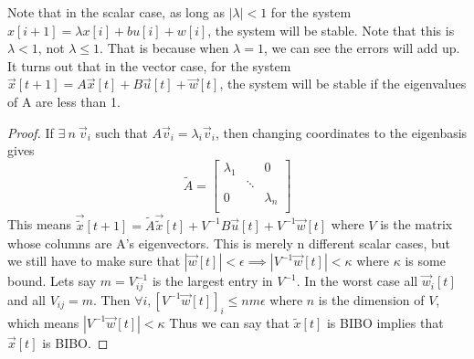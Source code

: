 \documentclass{article}
\newtheorem{proof}{Proof}
\begin{document}
Note that in the scalar case, as long as $|\lambda| < 1$ for the system $x[i+1]=\lambda x[i]+bu[i]+w[i]$, the system will be stable. Note that this is $\lambda<1$, not $\lambda \leq 1$. That is because when $\lambda=1$, we can see the errors will add up.
It turns out that in the vector case, for the system $\vec{x}[t+1]=A \vec{x}[t]+B\vec{u}[t]+\vec{w}[t]$, the system will be stable if the eigenvalues of A are less than 1.
\begin{proof}
    If $\exists \> n \> \vec{v}_i$ such that $A\vec{v}_i=\lambda_i\vec{v}_i$, then changing coordinates to the eigenbasis gives
    $$\tilde{A}=
        \left[
        \begin{array}{ccc}
        \lambda_1 &  & 0 \\
         & \ddots &  \\
        0 &  & \lambda_n \\
        \end{array}
        \right] $$
    This means $\vec{\tilde{x}}[t+1]=\tilde{A}\vec{\tilde{x}}[t]+V^{-1}B\vec{u}[t]+V^{-1}\vec{w}[t]$ where $V$ is the matrix whose columns are A's eigenvectors.
    This is merely n different scalar cases, but we still have to make sure that $|\vec{w}[t]|<\epsilon \implies |V^{-1}\vec{w}[t]|<\kappa$ where $\kappa$ is some bound.
    Lets say $m=V_{ij}^{-1}$ is the largest entry in $V^{-1}$. In the worst case all $\vec{w}_i[t]$ and all $V_{ij}=m$.
    Then $\forall i, \left[V^{-1}\vec{w}[t]\right]_i \leq n m \epsilon$ where $n$ is the dimension of $V$, which means $|V^{-1}\vec{w}[t]|<\kappa$
    Thus we can say that $\tilde{x}[t]$ is BIBO implies that $\vec{x}[t]$ is BIBO.
\end{proof}
\end{document}
